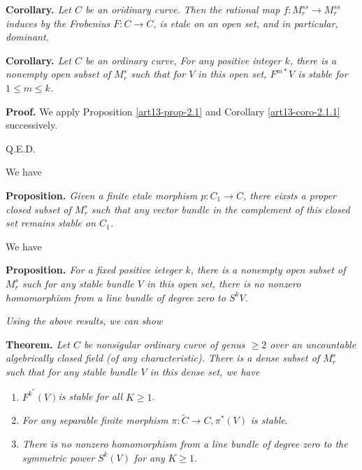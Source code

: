 \medskip
\noindent
{\bfseries {} Corollary. \label{art13-coro-2.1.1}} \textit{Let $C$ be an oridinary curve. Then the rational map $f: M_{r}^{ss} \rightarrow M_{r}^{ss}$ induces by the Frobenius $F: C \rightarrow C$, is etale on an open set, and in particular, dominant.}


\medskip
\noindent
{\bfseries {} Corollary. \label{art13-coro-2.1.2}} \textit{Let $C$ be an ordinary curve, For any positive integer $k$, there is a nonempty open subset of $M_{r}^{s}$ such that for $V$ in this open set, $F^{m*}V$ is stable for
$1 \leq m \leq k$. }

\medskip
\noindent
{\bfseries Proof.} We apply Proposition \eqref{art13-prop-2.1} and Corollary \eqref{art13-coro-2.1.1} successively.

\hfill Q.E.D.

We have

\medskip
\noindent
{\bfseries {} Proposition. \label{art13-prop-2.2}} \textit{Given a finite etale morphism $p : C_{1} \rightarrow C$, there eixsts a proper closed subset of $M_{r}^{s}$ such that any vector bundle in the complement of this closed set remains  stable on $C_{1}$.} 

We have

\medskip
\noindent
{\bfseries {} Proposition. \label{art13-prop-2.3}} \textit{For a fixed positive ieteger $k$, there is a nonempty open subset of $M_{r}^{s}$  such for any stable bundle $V$  in this open set, there is no nonzero homomorphism from a line bundle of degree zero to $S^{k}V$.}

\textit{Using the above results, we can show
}

\medskip
\noindent
{\bfseries {} Theorem. \label{art13-thm-2.4}} \textit{Let $C$ be nonsigular ordinary curve of genus $\geq 2$ over an uncountable algebrically closed field (of any characteristic). There is a dense subset of $M_{r}^{s}$ such that for any stable bundle $V$ in this dense set, we have}
\begin{enumerate}[\it 1)]
\item $F^{k^{*}}(V)$\textit{is stable for all} $K \geq 1$.\label{art13-thm2.4-enum-1}

\item \textit{For any separable finite morphism} $\pi : \tilde{C} \rightarrow C, \pi^{*}(V)$ \textit{is stable}.\label{art13-thm2.4-enum-2}

\item \textit{There is no nonzero homomorphism from a line bundle of degree zero to the symmetric power} $S^{k}(V)$
 \textit{for any} $K \geq 1$.\label{art13-thm2.4-enum-3}
\end{enumerate}


